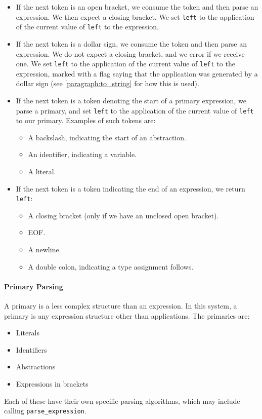 \begin{itemize}
    \item If the next token is an open bracket, we consume the token and then parse an expression. We then expect a closing bracket. We set \verb|left| to the application of the current value of \verb|left| to the expression.
    \item If the next token is a dollar sign, we consume the token and then parse an expression. We do not expect a closing bracket, and we error if we receive one.  We set \verb|left| to the application of the current value of \verb|left| to the expression, marked with a flag saying that the application was generated by a dollar sign (see \ref{paragraph:to_string} for how this is used).
    \item If the next token is a token denoting the start of a primary expression, we parse a primary, and set \verb|left| to the application of the current value of \verb|left| to our primary. Examples of such tokens are:
    \begin{itemize}
        \item A backslash, indicating the start of an abstraction.
        \item An identifier, indicating a variable.
        \item A literal.
    \end{itemize}

    \item If the next token is a token indicating the end of an expression, we return \verb|left|:
    \begin{itemize}
        \item A closing bracket (only if we have an unclosed open bracket).
        \item EOF.
        \item A newline.
        \item A double colon, indicating a type assignment follows.
    \end{itemize}
\end{itemize}

\paragraph{Primary Parsing}
\label{impl:parsing_primary}
A primary is a less complex structure than an expression. In this system, a primary is any expression structure other than applications. The primaries are:
\begin{itemize}
    \item Literals
    \item Identifiers
    \item Abstractions
    \item Expressions in brackets
\end{itemize}
Each of these have their own specific parsing algorithms, which may include calling \verb|parse_expression|. 

